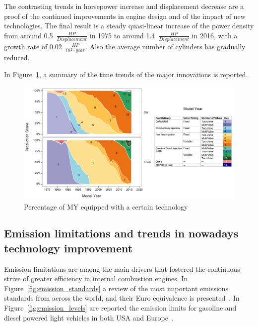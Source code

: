 The contrasting trends in horsepower increase and displacement decrease are a proof of the continued improvements in engine design and of the impact of new technologies. The final result is a steady quasi-linear increase of the power density from around 0.5~$\frac{HP}{Displacement}$ in 1975 to around 1.4~$\frac{HP}{Displacement}$ in 2016, with a growth rate of 0.02~$\frac{HP}{in^{2} \cdot year}$. Also the average number of cylinders has gradually reduced.

In Figure~\ref{fig:technology_trends}, a summary of the time trends of the major innovations is reported.

\begin{figure}[ht]
  \centering  \includegraphics[width=\textwidth]{figures/review/technology_trends.png}
  \caption{Percentage of MY equipped with a certain technology  \label{fig:technology_trends} }
\end{figure}


\subsection{Emission limitations and trends in nowadays technology improvement}
\label{sec:technology_improvements}

Emission limitations are among the main drivers that fostered the continuous strive of greater efficiency in internal combustion engines. In Figure~\ref{fig:emission_standards} a review of the most important emissions standards from across the world, and their Euro equivalence is presented~\cite{Miller2014}. In Figure~\ref{fig:emission_levels} are reported the emission limits for gasoline and diesel powered light vehicles in both USA and Europe~\cite{Transportpolicy.net2016}.

